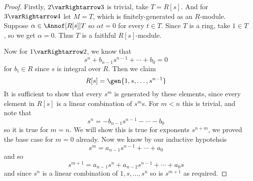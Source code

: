 \documentclass[10pt]{article}
\begin{document}
\begin{proof}

   Firstly, $2\varRightarrow3$ is trivial, take $T=R[s]$.
   And for $3\varRightarrow4$ let $M=T$, which is finitely-generated as an $R$-module.
   Suppose $\alpha\in\Annof[{R[s]}]T$ so $\alpha t=0$ for every $t\in T$.
   Since $T$ is a ring, take $1\in T$, so we get $\alpha=0$.
   Thus $T$ is a faithful $R[s]$-module.

   Now for $1\varRightarrow2$, we know that
   \[ s^n + b_{n-1}s^{n-1} + \cdots + b_0 = 0 \]
   for $b_i\in R$ since $s$ is integral over $R$.
   Then we claim
   \[ R[s] = \gen{1,s,\dots,s^{n-1}} \]
   It is sufficient to show that every $s^m$ is generated by these elements, since every element in $R[s]$ is a linear combination of $s^m$s.
   For $m<n$ this is trivial, and note that
   \[ s^n = -b_{n-1}s^{n-1} - \cdots - b_0 \]
   so it is true for $m=n$.
   We will show this is true for exponents $s^{n+m}$, we proved the base case for $m=0$ already.
   Now we know by our inductive hypotehsis
   \[ s^m = a_{n-1}s^{n-1} + \cdots + a_0 \]
   and so
   \[ s^{m+1} = a_{n-1}s^n + a_{n-2}s^{n-1} + \cdots + a_0s \]
   and since $s^n$ is a linear combination of $1,s,\dots,s^n$ so is $s^{m+1}$ as required.


\end{proof}
\end{document}
